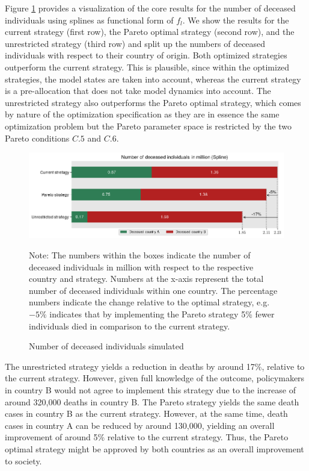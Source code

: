 Figure \ref{fig:results_splines_numbers} provides a visualization of the core results for the number of deceased individuals using splines as functional form of $f_l$. We show the results for the current strategy (first row), the Pareto optimal strategy (second row), and the unrestricted strategy (third row) and split up the numbers of deceased individuals with respect to their country of origin. Both optimized strategies outperform the current strategy. This is plausible, since within the optimized strategies, the model states are taken into account, whereas the current strategy is a pre-allocation that does not take model dynamics into account. The unrestricted strategy also outperforms the Pareto optimal strategy, which comes by nature of the optimization specification as they are in essence the same optimization problem but the Pareto parameter space is restricted by the two Pareto conditions $C.5$ and $C.6$. 
\begin{figure}[h!]
\centering
\includegraphics[scale=0.75]{images/splines_percentage_deviation.png}
\begin{flushleft}
\scriptsize{Note: The numbers within the boxes indicate the number of deceased individuals in million with respect to the respective country and strategy. Numbers at the x-axis represent the total number of deceased individuals within one country. The percentage numbers indicate the change relative to the optimal strategy, e.g. $-5\%$ indicates that by implementing the Pareto strategy 5\% fewer individuals died in comparison to the current strategy.}
\end{flushleft}
\caption{Number of deceased individuals simulated}
\label{fig:results_splines_numbers}
\end{figure}

The unrestricted strategy yields a reduction in deaths by around 17\%, relative to the current strategy. However, given full knowledge of the outcome, policymakers in country B would not agree to implement this strategy due to the increase of around 320,000 deaths in country B. The Pareto strategy yields the same death cases in country B as the current strategy. However, at the same time, death cases in country A can be reduced by around 130,000, yielding an overall improvement of around 5\% relative to the current strategy. Thus, the Pareto optimal strategy might be approved by both countries as an overall improvement to society. \\

